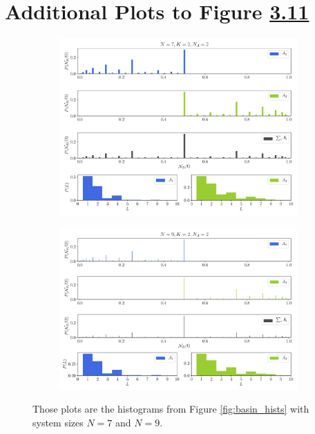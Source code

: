 \section{Additional Plots to Figure \hyperref[fig:basin_hists]{3.11}}\label{sec:basin_hists_additional}
\begin{figure}[h!]
	\begin{subfigure}{\textwidth}
		\includegraphics[width=\textwidth]{Plots/basin_hists_N7_2}
	\end{subfigure}
	\begin{subfigure}{\textwidth}
		\includegraphics[width=\textwidth]{Plots/basin_hists_N9_2}
	\end{subfigure}
	\caption{Those plots are the histograms from Figure \ref{fig:basin_hists} with system sizes $N=7$ and $N=9$.}
	\label{fig:basin_hists_additional_sizes}
\end{figure}

